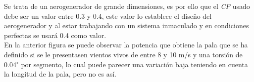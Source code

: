 Se trata de un aerogenerador de grande dimensiones, es por ello que el \textit{CP} usado debe ser un valor entre 0.3 y 0.4, este valor lo establece el diseño del aerogenerador y al estar trabajando con un sistema inmaculado y en condiciones perfectas se usará 0.4 como valor.\\




En la anterior figura se puede observar la potencia que obtiene la pala que se ha definido si se le presentasen vientos vivos de entre 8 y 10 m/s y una torsión de 0.04$^{\circ}$ por segmento, lo cual puede parecer una variación baja teniendo en cuenta la longitud de la pala, pero no es así.\\